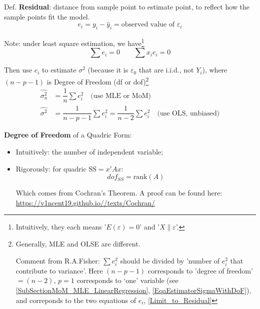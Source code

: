     
    Def. \textbf{Residual}: distance from sample point to estimate point, to reflect how the sample points fit the model.
    \begin{equation}
        e_i=y_i-\hat{y}_i=\text{observed value of }\varepsilon _i 
    \end{equation}
    
    Note: under least square estimation, we have\footnote{Intuitively, they each means '$ E(\varepsilon )=0 $' and '$ X\parallel \varepsilon  $'.}
\begin{equation}\label{Limit_to_Residual}
        \sum e_i=0\qquad \sum x_ie_i=0 
\end{equation}
    

    Then use $ e_i $ to estimate $ \sigma ^2 $ (because it is $ \varepsilon _0 $ that are i.i.d., not $ Y_i $), where $ (n-p-1) $ is Degree of Freedom (df or dof)\footnote{Generally, MLE and OLSE are different.

    Comment from R.A.Fisher: $ \sum e_i^2 $ should be divided by 'number of $ e_i^2 $ that contribute to variance'. Here $ (n-p-1) $ corresponds to 'degree of freedom' $ =(n-2) $, $ p=1 $ corresponds to `one' variable (see \autoref{SubSectionMoM_MLE_LinearRegression}, \autoref{EqaEstimatorSigmaWithDoF}), and correponds to the two equations of $ e_i $, \autoref{Limit_to_Residual}}
\begin{equation}\label{EqaOLSEstimatorOfSigma}
    \begin{aligned}
        \hat{\sigma _n^2}&=\dfrac{1}{n}\sum e_i^2 \quad\text{(use MLE or MoM)}\\
        \hat{\sigma^2}&=\dfrac{1}{n-p-1}\sum e_i^2=\dfrac{1}{n-2}\sum e_i^2\quad\text{(use OLS, unbiased)}
\end{aligned}
\end{equation}

\textbf{Degree of Freedom} of a Quadric Form:
\begin{itemize}[topsep=2pt,itemsep=2pt]
    \item Intuitively: the number of independent variable;
    \item Rigorously: for quadric $ \mathrm{SS}=x'Ax $:
    \begin{equation}\label{EqaDefinitionOfDegreeOfFreedom}
        dof_{SS}=\mathrm{rank}(A)
    \end{equation}

    Which comes from Cochran's Theorem. A proof can be found here: \url{https://v1ncent19.github.io//texts/Cochran/}
    
    
    
\end{itemize}

